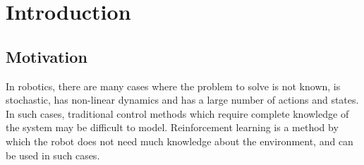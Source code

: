 \documentclass[hidelinks,BTech]{iitmdiss}
\begin{document}






\clearpage




\chapter{Introduction}

\section{Motivation}

In robotics, there are many cases where the problem to solve is not known, is stochastic, has non-linear dynamics and has a large number of actions and states. In such cases, traditional control methods which require complete knowledge of the system may be difficult to model. Reinforcement learning is a method by which the robot does not need much knowledge about the environment, and can be used in such cases.
\end{document}
